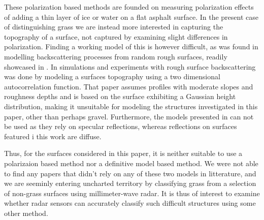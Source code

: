 These polarization based methods are founded on measuring polarization effects of adding a thin layer of ice or water on a flat asphalt surface. In the present case of distinguishing grass we are instead more interested in capturing the topography of a surface, not captured by examining slight differences in polarization. Finding a working model of this is however difficult, as was found in modelling backscattering processes from random rough surfaces, readily showcased in \citep{fung_li_chen_1992}. In \citep{scharf_iberle_mantz_walter_waldschrnidt_2018} simulations and experiments with rough surface backscattering was done by modeling a surfaces topography using a two dimensional autocorrelation function. That paper assumes profiles with moderate slopes and roughness depths and is based on the surface exhibiting a Gaussian height distribution, making it unsuitable for modeling the structures investigated in this paper, other than perhaps gravel. Furthermore, the models presented in \citep{fung_li_chen_1992} can not be used as they rely on specular reflections, whereas reflections on surfaces featured i this work are diffuse.

Thus, for the surfaces considered in this paper, it is neither suitable to use a polarizaion based method nor a definitive model based method. We were not able to find any papers that didn't rely on any of these two models in litterature, and we are seeminly entering uncharted territory by classifying grass from a selection of non-grass surfaces using millimeter-wave radar. It is thus of interest to examine whether radar sensors can accurately classify such difficult structures using some other method. 









